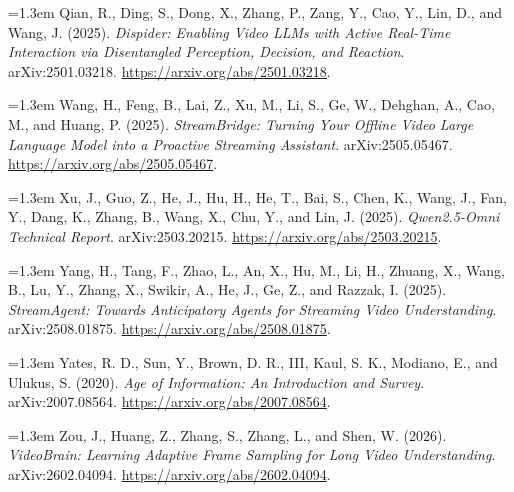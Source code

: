\documentclass[11pt,letterpaper]{article}
\newcommand{\refentry}[1]{\par\begingroup\small\setlength{\parindent}{0pt}\hangindent=1.3em\hangafter=1 #1\par\endgroup\vspace{5pt}}
\begin{document}
\refentry{Qian, R., Ding, S., Dong, X., Zhang, P., Zang, Y., Cao, Y., Lin, D., and Wang, J. (2025). \emph{Dispider: Enabling Video LLMs with Active Real-Time Interaction via Disentangled Perception, Decision, and Reaction}. arXiv:2501.03218. \url{https://arxiv.org/abs/2501.03218}.}

\refentry{Wang, H., Feng, B., Lai, Z., Xu, M., Li, S., Ge, W., Dehghan, A., Cao, M., and Huang, P. (2025). \emph{StreamBridge: Turning Your Offline Video Large Language Model into a Proactive Streaming Assistant}. arXiv:2505.05467. \url{https://arxiv.org/abs/2505.05467}.}

\refentry{Xu, J., Guo, Z., He, J., Hu, H., He, T., Bai, S., Chen, K., Wang, J., Fan, Y., Dang, K., Zhang, B., Wang, X., Chu, Y., and Lin, J. (2025). \emph{Qwen2.5-Omni Technical Report}. arXiv:2503.20215. \url{https://arxiv.org/abs/2503.20215}.}

\refentry{Yang, H., Tang, F., Zhao, L., An, X., Hu, M., Li, H., Zhuang, X., Wang, B., Lu, Y., Zhang, X., Swikir, A., He, J., Ge, Z., and Razzak, I. (2025). \emph{StreamAgent: Towards Anticipatory Agents for Streaming Video Understanding}. arXiv:2508.01875. \url{https://arxiv.org/abs/2508.01875}.}

\refentry{Yates, R. D., Sun, Y., Brown, D. R., III, Kaul, S. K., Modiano, E., and Ulukus, S. (2020). \emph{Age of Information: An Introduction and Survey}. arXiv:2007.08564. \url{https://arxiv.org/abs/2007.08564}.}

\refentry{Zou, J., Huang, Z., Zhang, S., Zhang, L., and Shen, W. (2026). \emph{VideoBrain: Learning Adaptive Frame Sampling for Long Video Understanding}. arXiv:2602.04094. \url{https://arxiv.org/abs/2602.04094}.}
\end{document}
